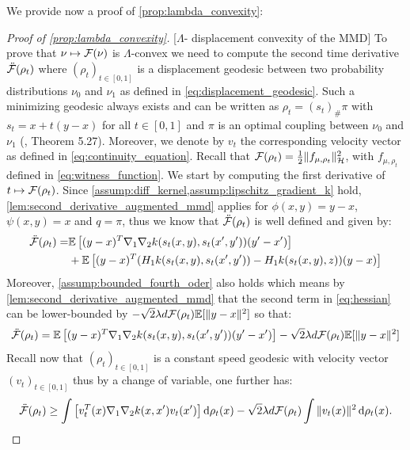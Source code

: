 We provide now a proof of \cref{prop:lambda_convexity}:
\begin{proof}[Proof of \cref{prop:lambda_convexity}]\label{proof:prop:lambda_convexity}[$\Lambda$- displacement convexity of the MMD]
To prove that $\nu\mapsto {{\mathcal F}}(\nu)$ is $\Lambda$-convex
we need to compute the second time derivative $\ddot{{{\mathcal F}}}(\rho_{t})$
where $(\rho_{t})_{t \in [0,1]}$ is a displacement geodesic between two probability
distributions $\nu_{0}$ and $\nu_{1}$ as defined in \cref{eq:displacement_geodesic}. Such a minimizing geodesic always exists and can be written as $\rho_t = (s_t)_{\#}\pi$ with $s_t = x + t(y-x)$ for all $t\in [0,1]$ and $\pi$ is an optimal coupling between $\nu_0$ and $\nu_1$ (\cite{Santambrogio:2015}, Theorem 5.27). Moreover, we denote by $v_t$ the corresponding velocity vector as defined in \cref{eq:continuity_equation}. Recall that ${{\mathcal F}}(\rho_t) = \frac{1}{2} \Vert f_{\mu,\rho_t}\Vert^2_{\mathcal{H}}$, with $f_{\mu,\rho_t}$ defined in \cref{eq:witness_function}. %
We start by computing the first derivative of $ t\mapsto {{\mathcal F}}(\rho_t) $. Since \cref{assump:diff_kernel,assump:lipschitz_gradient_k} hold, \cref{lem:second_derivative_augmented_mmd} applies for $\phi(x,y) = y-x$, $\psi(x,y) = x$ and $q = \pi$, thus we know that $\ddot{{{\mathcal F}}}(\rho_t)$ is well defined and given by:
\begin{align}\label{eq:hessian}
\begin{split}
	\ddot{{{\mathcal F}}}(\rho_t) =&\mathbb{E}\left[ (y-x)^T\nabla_1 \nabla_2 k(s_t(x,y),s_t(x',y'))(y'-x')\right]\\
&+ \mathbb{E}\left[ (y-x)^T( H_1 k(s_t(x,y),s_t(x',y'))-H_1 k(s_t(x,y),z))(y-x)\right]
\end{split}
\end{align}
Moreover, \cref{assump:bounded_fourth_oder} also holds which means by \cref{lem:second_derivative_augmented_mmd} that the second term in \cref{eq:hessian} can be lower-bounded by $-\sqrt{2}\lambda d{{\mathcal F}}(\rho_t)\mathbb{E}[ \Vert y-x \Vert^2]$ so that:
\[
\ddot{{{\mathcal F}}}(\rho_t) =\mathbb{E}\left[ (y-x)^T\nabla_1 \nabla_2 k(s_t(x,y),s_t(x',y'))(y'-x')\right] - \sqrt{2}\lambda d{{\mathcal F}}(\rho_t) \mathbb{E}[ \Vert y-x \Vert^2]
\]
Recall now that $(\rho_t)_{t \in [0,1]}$ is a constant speed geodesic with velocity vector $(v_t)_{t\in [0,1]}$ thus by a change of variable, one further has:%
\[
\ddot{{{\mathcal F}}}(\rho_t) \geq\int\left[ v_t^T(x)\nabla_1 \nabla_2 k(x,x')v_t(x')\right]\mathop{}\!\mathrm{d} \rho_t(x) - \sqrt{2}\lambda d{{\mathcal F}}(\rho_t) \int \Vert v_t(x) \Vert^2 \mathop{}\!\mathrm{d} \rho_t(x).
\]
\end{proof}

